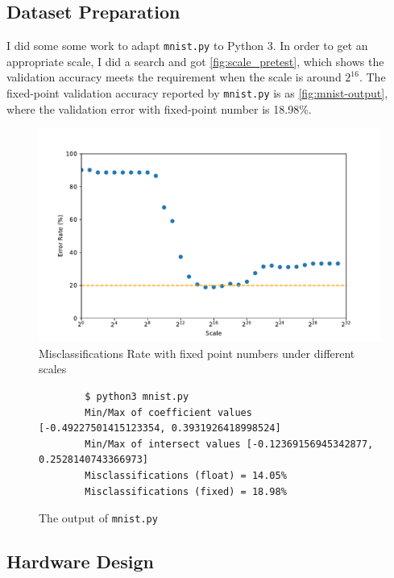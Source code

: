 
\subsection{Dataset Preparation}

I did some some work to adapt \nolinkurl{mnist.py} to Python 3.
In order to get an appropriate scale, I did a search and got \autoref{fig:scale_pretest}, which shows the validation accuracy meets the requirement when the scale is around \(2^{16}\).
The fixed-point validation accuracy reported by \nolinkurl{mnist.py} is as \autoref{fig:mnist-output}, where the validation error with fixed-point number is 18.98\%.

\begin{figure}[ht!]
    \centering
    \includegraphics[scale=0.64]{images/scale_pretest.pdf}
    \caption{Misclassifications Rate with fixed point numbers under different scales}
    \label{fig:scale_pretest}
\end{figure}

\begin{figure}[ht!]
    \begin{verbatim}
        $ python3 mnist.py 
        Min/Max of coefficient values [-0.49227501415123354, 0.3931926418998524]
        Min/Max of intersect values [-0.12369156945342877, 0.2528140743366973]
        Misclassifications (float) = 14.05%
        Misclassifications (fixed) = 18.98%
    \end{verbatim}
    \caption{The output of \nolinkurl{mnist.py}}
    \label{fig:mnist-output}
\end{figure}

\subsection{Hardware Design}

